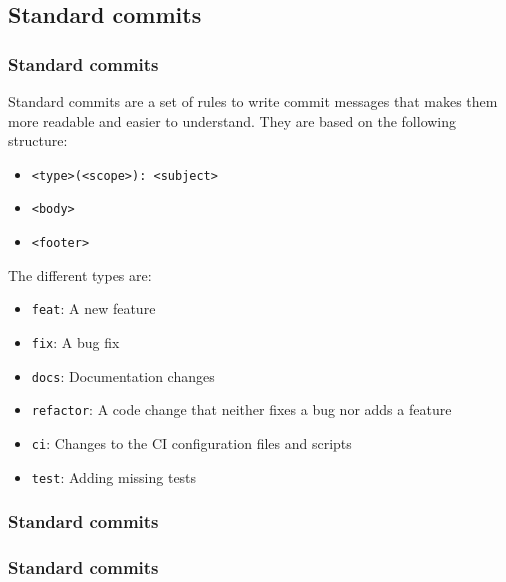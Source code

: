 \documentclass{beamer}
\begin{document}
    \subsection{Standard commits}\label{subsec:standard-commits}
    \begin{frame}
        \frametitle{Standard commits}
        Standard commits are a set of rules to write commit messages that makes them more readable and easier to understand.
        They are based on the following structure:
        \begin{itemize}
            \item \texttt{<type>(<scope>): <subject>}
            \item \texttt{<body>}
            \item \texttt{<footer>}
        \end{itemize}
        The different types are:
        \begin{itemize}
            \item \texttt{feat}: A new feature
            \item \texttt{fix}: A bug fix
            \item \texttt{docs}: Documentation changes
            \item \texttt{refactor}: A code change that neither fixes a bug nor adds a feature
            \item \texttt{ci}: Changes to the CI configuration files and scripts
            \item \texttt{test}: Adding missing tests
        \end{itemize}
    \end{frame}
    \begin{frame}
        \frametitle{Standard commits}
        \begin{figure}[H]
            \centering
            \noindent
        \end{figure}
    \end{frame}
    \begin{frame}
        \frametitle{Standard commits}
        \begin{figure}[H]
            \centering
            \noindent
        \end{figure}
    \end{frame}
\end{document}

